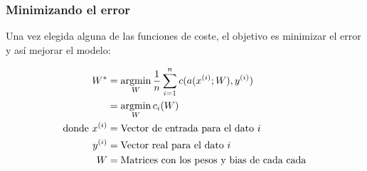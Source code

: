 \subsubsection{Minimizando el error}\label{minimizing-error}

Una vez elegida alguna de las funciones de coste, el objetivo es minimizar el error y así mejorar el modelo:

\begin{equation}
\begin{split}
        W^* &= \operatorname*{argmin}_{W} \frac{1}{n} \sum_{i=1}^n c(a(x^{(i)}; W), y^{(i)}) \\
        &= \operatorname*{argmin}_{W} c_i(W) \\
        \text{donde}~x^{(i)} &= \text{Vector de entrada para el dato }i \\
        y^{(i)} &= \text{Vector real para el dato }i \\
        W &= \text{Matrices con los pesos y bias de cada cada} 
  \end{split}
\end{equation}

